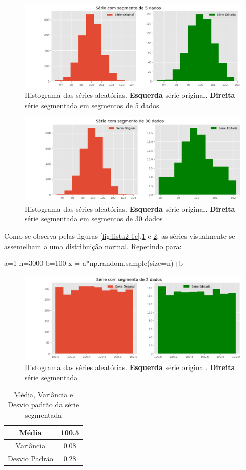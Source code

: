 \documentclass[12pt,a4paper,portuguese]{article}
\begin{document}
\begin{figure}[H]
	\centering
	\includegraphics[width=0.9\linewidth]{lista2-1d}
	\caption{Histograma das séries aleatórias. \textbf{Esquerda} série original. \textbf{Direita} série segmentada em segmentos de 5 dados}
	\label{fig:lista2-1d}
\end{figure}


\begin{figure}[H]
	\centering
	\includegraphics[width=0.9\linewidth]{lista2-1e}
	\caption{Histograma das séries aleatórias. \textbf{Esquerda} série original. \textbf{Direita} série segmentada em segmentos de 30 dados}
	\label{fig:lista2-1e}
\end{figure}
Como se observa pelas figuras \ref{fig:lista2-1c},\ref{fig:lista2-1d} e \ref{fig:lista2-1e}, as séries visualmente se assemelham a uma distribuição normal.
Repetindo para:
\begin{python}
a=1
n=3000
b=100
x = a*np.random.sample(size=n)+b
\end{python}
\begin{figure}[H]
	\centering
	\includegraphics[width=0.9\linewidth]{lista2-2c}
	\caption{Histograma das séries aleatórias. \textbf{Esquerda} série original. \textbf{Direita} série segmentada}
	\label{fig:lista2-2c}
\end{figure}
\begin{table}[H]
	\centering
	\begin{tabular}{|c|c|}
		\hline
		Média & 100.5 \\
		\hline
		Variância & 0.08 \\
		\hline
		Desvio Padrão & 0.28 \\
		\hline
	\end{tabular}
	\caption{Média, Variância e Desvio padrão da série segmentada}
	\label{y2}
\end{table}
	
\end{document}
